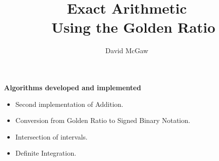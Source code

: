 \documentclass{csslides}\raggedright
\begin{document}
\title{Exact Arithmetic \\~ Using the Golden Ratio \\ [5ex]}
\author{David McGaw}
\date[CS]{}

\begin{slide}{}
\vfill
{\bf Algorithms developed and implemented}
\begin{itemize}
\item Second implementation of Addition.
\item Conversion from Golden Ratio to Signed Binary Notation.
\item Intersection of intervals.
\item Definite Integration.
\end{itemize}
\vfill
\end{slide}
\end{document}
